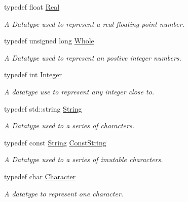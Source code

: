 \begin{DoxyCompactItemize}
\item 
typedef float \hyperlink{namespacephys_af7eb897198d265b8e868f45240230d5f}{Real}
\begin{DoxyCompactList}\small\item\em A Datatype used to represent a real floating point number. \item\end{DoxyCompactList}\item 
typedef unsigned long \hyperlink{namespacephys_a460f6bc24c8dd347b05e0366ae34f34a}{Whole}
\begin{DoxyCompactList}\small\item\em A Datatype used to represent an postive integer numbers. \item\end{DoxyCompactList}\item 
typedef int \hyperlink{namespacephys_a7f09bf5585b2bb97613cd9aad4273a81}{Integer}
\begin{DoxyCompactList}\small\item\em A datatype use to represent any integer close to. \item\end{DoxyCompactList}\item 
typedef std::string \hyperlink{namespacephys_aa03900411993de7fbfec4789bc1d392e}{String}
\begin{DoxyCompactList}\small\item\em A Datatype used to a series of characters. \item\end{DoxyCompactList}\item 
typedef const \hyperlink{namespacephys_aa03900411993de7fbfec4789bc1d392e}{String} \hyperlink{namespacephys_a5ce5049f8b4bf88d6413c47b504ebb31}{ConstString}
\begin{DoxyCompactList}\small\item\em A Datatype used to a series of imutable characters. \item\end{DoxyCompactList}\item 
typedef char \hyperlink{namespacephys_a3098bae5b0a3cd16eec331f766cc562b}{Character}
\begin{DoxyCompactList}\small\item\em A datatype to represent one character. \item\end{DoxyCompactList}\item 

\end{DoxyCompactItemize}

